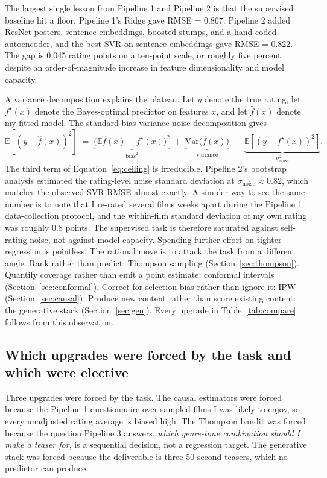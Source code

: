 \documentclass{article}
\begin{document}
The largest single lesson from Pipeline 1 and Pipeline 2 is that the supervised baseline hit a floor. Pipeline 1's Ridge gave RMSE = 0.867. Pipeline 2 added ResNet posters, sentence embeddings, boosted stumps, and a hand-coded autoencoder, and the best SVR on sentence embeddings gave RMSE = 0.822. The gap is 0.045 rating points on a ten-point scale, or roughly five percent, despite an order-of-magnitude increase in feature dimensionality and model capacity.

A variance decomposition explains the plateau. Let $y$ denote the true rating, let $f^\star(x)$ denote the Bayes-optimal predictor on features $x$, and let $\hat{f}(x)$ denote my fitted model. The standard bias-variance-noise decomposition gives
\begin{equation}
\mathbb{E}\!\left[(y - \hat{f}(x))^2\right] \;=\; \underbrace{\bigl(\mathbb{E}\hat{f}(x) - f^\star(x)\bigr)^2}_{\text{bias}^2} \;+\; \underbrace{\mathrm{Var}\bigl(\hat{f}(x)\bigr)}_{\text{variance}} \;+\; \underbrace{\mathbb{E}\!\left[(y - f^\star(x))^2\right]}_{\sigma_{\text{noise}}^2}.
\label{eq:ceiling}
\end{equation}
The third term of Equation~\ref{eq:ceiling} is irreducible. Pipeline 2's bootstrap analysis estimated the rating-level noise standard deviation at $\sigma_{\text{noise}} \approx 0.82$, which matches the observed SVR RMSE almost exactly. A simpler way to see the same number is to note that I re-rated several films weeks apart during the Pipeline 1 data-collection protocol, and the within-film standard deviation of my own rating was roughly 0.8 points. The supervised task is therefore saturated against self-rating noise, not against model capacity. Spending further effort on tighter regression is pointless. The rational move is to attack the task from a different angle. Rank rather than predict: Thompson sampling (Section~\ref{sec:thompson}). Quantify coverage rather than emit a point estimate: conformal intervals (Section~\ref{sec:conformal}). Correct for selection bias rather than ignore it: IPW (Section~\ref{sec:causal}). Produce new content rather than score existing content: the generative stack (Section~\ref{sec:gen}). Every upgrade in Table~\ref{tab:compare} follows from this observation.

\subsection{Which upgrades were forced by the task and which were elective}

Three upgrades were forced by the task. The causal estimators were forced because the Pipeline 1 questionnaire over-sampled films I was likely to enjoy, so every unadjusted rating average is biased high. The Thompson bandit was forced because the question Pipeline 3 answers, \emph{which genre-tone combination should I make a teaser for}, is a sequential decision, not a regression target. The generative stack was forced because the deliverable is three 50-second teasers, which no predictor can produce.
\end{document}
